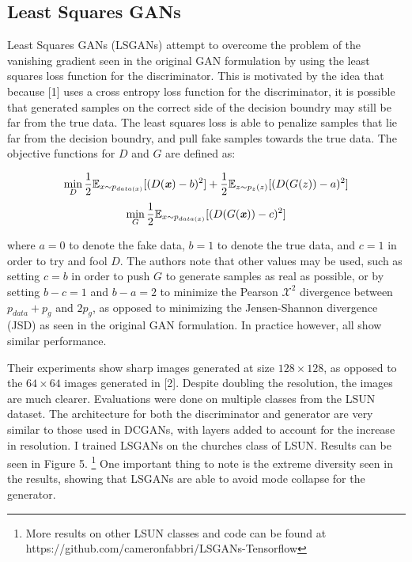 \documentclass{article}
\begin{document}
\subsection{Least Squares GANs}
Least Squares GANs (LSGANs) attempt to overcome the problem of the vanishing gradient seen in the original GAN formulation by using the least squares loss function for the
discriminator. This is motivated by the idea that because [1] uses a cross entropy loss function for the discriminator, it is possible that generated samples on the correct side of the
decision boundry may still be far from the true data. The least squares loss is able to penalize samples that lie far from the decision boundry, and pull fake samples towards the
true data. The objective functions for $D$ and $G$ are defined as:

\[\min\limits_{D} \frac{1}{2} \mathbb{E}_{x \sim p_{data(x)}} [(D(\textbf{\textit{x}})-b)^2] + \frac{1}{2} \mathbb{E}_{z \sim p_z(z)}[(D(G(z)) - a)^2]\]
\[\min\limits_{G} \frac{1}{2} \mathbb{E}_{x \sim p_{data(x)}} [(D(G(\textbf{\textit{x}}))-c)^2] \]

\noindent where $a=0$ to denote the fake data, $b=1$ to denote the true data, and $c=1$ in order to try and fool $D$. The authors note that other values
may be used, such as setting $c=b$ in order to push $G$ to generate samples as real as possible, or by setting $b-c=1$ and $b-a=2$ to minimize the Pearson
$\mathcal{X}^2$ divergence between $p_{data}+p_g$ and $2p_g$, as opposed to minimizing the Jensen-Shannon divergence (JSD) as seen in the original GAN
formulation. In practice however, all show similar performance. \newline

\noindent Their experiments show sharp images generated at size $128\times128$, as opposed to the $64\times64$ images generated in [2]. Despite doubling
the resolution, the images are much clearer. Evaluations were done on multiple classes from the LSUN dataset. The architecture for both the discriminator
and generator are very similar to those used in DCGANs, with layers added to account for the increase in resolution. I trained LSGANs on the churches
class of LSUN. Results can be seen in Figure 5. \footnote{More results on other LSUN classes and code can be found at https://github.com/cameronfabbri/LSGANs-Tensorflow}
One important thing to note is the extreme diversity seen in the results, showing that LSGANs are able to avoid mode collapse for the generator.
\end{document}
